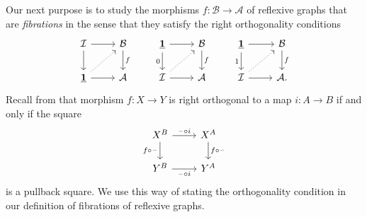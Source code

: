 Our next purpose is to study the morphisms $f:\mathcal{B}\to\mathcal{A}$ of reflexive graphs that are \emph{fibrations} in the sense that they satisfy the right orthogonality conditions
\begin{equation*}
\begin{tikzcd}
\mathcal{I} \arrow[r] \arrow[d] & \mathcal{B} \arrow[d,"f"] & \unit \arrow[d,swap,"0"] \arrow[r] & \mathcal{B} \arrow[d,"f"] & \unit \arrow[d,swap,"1"] \arrow[r] & \mathcal{B} \arrow[d,"f"] \\
\unit \arrow[ur,densely dotted] \arrow[r] & \mathcal{A} & \mathcal{I} \arrow[ur,densely dotted] \arrow[r] & \mathcal{A} & \mathcal{I} \arrow[ur,densely dotted] \arrow[r] & \mathcal{A}.
\end{tikzcd}
\end{equation*}
Recall from \cite{AnelBiedermanFinserJoyal} that morphism $f:X\to Y$ is right orthogonal to a map $i:A\to B$ if and only if the square
\begin{equation*}
\begin{tikzcd}
X^B \arrow[r,"\blank\circ i"] \arrow[d,swap,"f\circ \blank"] & X^A \arrow[d,"f\circ \blank"] \\
Y^B \arrow[r,swap,"\blank\circ i"] & Y^A
\end{tikzcd}
\end{equation*}
is a pullback square. We use this way of stating the orthogonality condition in our definition of fibrations of reflexive graphs.

